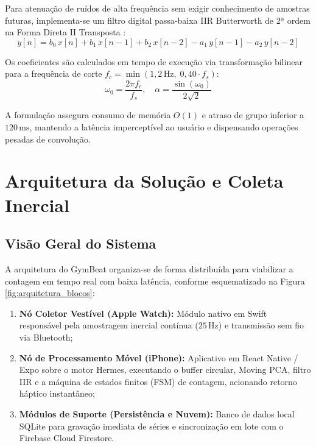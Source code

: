 \documentclass[12pt]{article}
\begin{document}
Para atenuação de ruídos de alta frequência sem exigir conhecimento de amostras futuras, implementa-se um filtro digital passa-baixa IIR Butterworth de 2ª ordem na Forma Direta II Transposta \cite{oppenheim2009}:
\begin{equation}
y[n] = b_0\,x[n] + b_1\,x[n-1] + b_2\,x[n-2] - a_1\,y[n-1] - a_2\,y[n-2]
\end{equation}

Os coeficientes são calculados em tempo de execução via transformação bilinear para a frequência de corte $f_c = \min(1{,}2\,\text{Hz},\; 0{,}40 \cdot f_s)$:
\begin{equation}
\omega_0 = \frac{2\pi f_c}{f_s}, \quad \alpha = \frac{\sin(\omega_0)}{2\sqrt{2}}
\end{equation}

A formulação assegura consumo de memória $O(1)$ e atraso de grupo inferior a $120\,\text{ms}$, mantendo a latência imperceptível ao usuário e dispensando operações pesadas de convolução.

\section{Arquitetura da Solução e Coleta Inercial}

\subsection{Visão Geral do Sistema}

A arquitetura do GymBeat organiza-se de forma distribuída para viabilizar a contagem em tempo real com baixa latência, conforme esquematizado na Figura \ref{fig:arquitetura_blocos}:
\begin{enumerate}
    \item \textbf{Nó Coletor Vestível (Apple Watch):} Módulo nativo em Swift responsável pela amostragem inercial contínua ($25\,\text{Hz}$) e transmissão sem fio via Bluetooth;
    \item \textbf{Nó de Processamento Móvel (iPhone):} Aplicativo em React Native / Expo sobre o motor Hermes, executando o buffer circular, Moving PCA, filtro IIR e a máquina de estados finitos (FSM) de contagem, acionando retorno háptico instantâneo;
    \item \textbf{Módulos de Suporte (Persistência e Nuvem):} Banco de dados local SQLite para gravação imediata de séries e sincronização em lote com o Firebase Cloud Firestore.
\end{enumerate}
\end{document}
